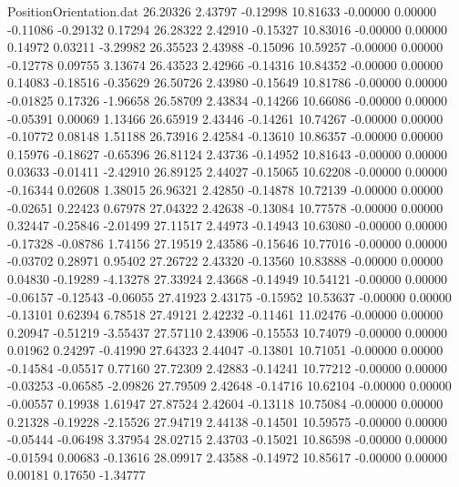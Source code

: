 \begin{filecontents}{PositionOrientation.dat}
  26.20326    2.43797   -0.12998    10.81633   -0.00000    0.00000   -0.11086   -0.29132    0.17294
  26.28322    2.42910   -0.15327    10.83016   -0.00000    0.00000    0.14972    0.03211   -3.29982
  26.35523    2.43988   -0.15096    10.59257   -0.00000    0.00000   -0.12778    0.09755    3.13674
  26.43523    2.42966   -0.14316    10.84352   -0.00000    0.00000    0.14083   -0.18516   -0.35629
  26.50726    2.43980   -0.15649    10.81786   -0.00000    0.00000   -0.01825    0.17326   -1.96658
  26.58709    2.43834   -0.14266    10.66086   -0.00000    0.00000   -0.05391    0.00069    1.13466
  26.65919    2.43446   -0.14261    10.74267   -0.00000    0.00000   -0.10772    0.08148    1.51188
  26.73916    2.42584   -0.13610    10.86357   -0.00000    0.00000    0.15976   -0.18627   -0.65396
  26.81124    2.43736   -0.14952    10.81643   -0.00000    0.00000    0.03633   -0.01411   -2.42910
  26.89125    2.44027   -0.15065    10.62208   -0.00000    0.00000   -0.16344    0.02608    1.38015
  26.96321    2.42850   -0.14878    10.72139   -0.00000    0.00000   -0.02651    0.22423    0.67978
  27.04322    2.42638   -0.13084    10.77578   -0.00000    0.00000    0.32447   -0.25846   -2.01499
  27.11517    2.44973   -0.14943    10.63080   -0.00000    0.00000   -0.17328   -0.08786    1.74156
  27.19519    2.43586   -0.15646    10.77016   -0.00000    0.00000   -0.03702    0.28971    0.95402
  27.26722    2.43320   -0.13560    10.83888   -0.00000    0.00000    0.04830   -0.19289   -4.13278
  27.33924    2.43668   -0.14949    10.54121   -0.00000    0.00000   -0.06157   -0.12543   -0.06055
  27.41923    2.43175   -0.15952    10.53637   -0.00000    0.00000   -0.13101    0.62394    6.78518
  27.49121    2.42232   -0.11461    11.02476   -0.00000    0.00000    0.20947   -0.51219   -3.55437
  27.57110    2.43906   -0.15553    10.74079   -0.00000    0.00000    0.01962    0.24297   -0.41990
  27.64323    2.44047   -0.13801    10.71051   -0.00000    0.00000   -0.14584   -0.05517    0.77160
  27.72309    2.42883   -0.14241    10.77212   -0.00000    0.00000   -0.03253   -0.06585   -2.09826
  27.79509    2.42648   -0.14716    10.62104   -0.00000    0.00000   -0.00557    0.19938    1.61947
  27.87524    2.42604   -0.13118    10.75084   -0.00000    0.00000    0.21328   -0.19228   -2.15526
  27.94719    2.44138   -0.14501    10.59575   -0.00000    0.00000   -0.05444   -0.06498    3.37954
  28.02715    2.43703   -0.15021    10.86598   -0.00000    0.00000   -0.01594    0.00683   -0.13616
  28.09917    2.43588   -0.14972    10.85617   -0.00000    0.00000    0.00181    0.17650   -1.34777

\end{filecontents}

